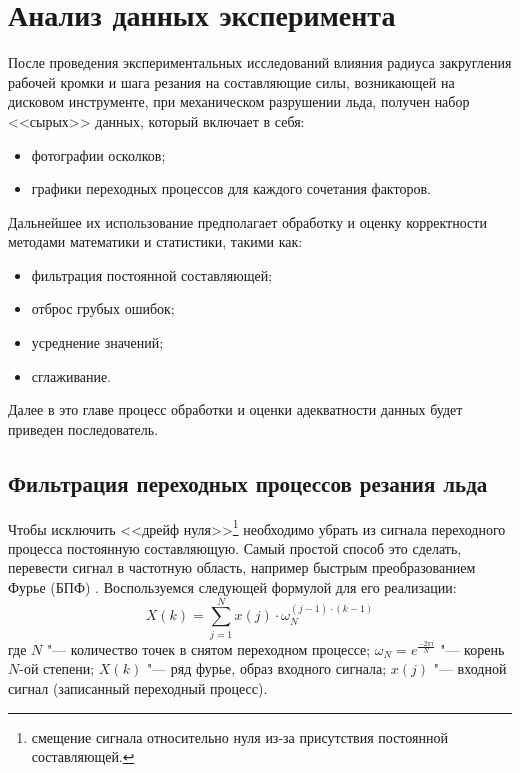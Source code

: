 \chapter{Анализ данных эксперимента}\label{chapt3}

После проведения экспериментальных исследований влияния радиуса закругления рабочей кромки и шага резания на составляющие силы, возникающей на дисковом инструменте, при механическом разрушении льда, получен набор <<сырых>> данных, который включает в себя:
\begin{itemize}
	\item фотографии осколков;
	\item графики переходных процессов для каждого сочетания факторов.
\end{itemize}

Дальнейшее их использование предполагает обработку и оценку корректности методами математики и статистики, такими как:
\begin{itemize}
	\item фильтрация постоянной составляющей;
	\item отброс грубых ошибок;
	\item усреднение значений;	
	\item сглаживание.
\end{itemize}

Далее в это главе процесс обработки и оценки адекватности данных будет приведен последователь.

\section{Фильтрация переходных процессов резания льда}\label{sect3_1}

Чтобы исключить <<дрейф нуля>>\footnote{смещение сигнала относительно нуля из-за присутствия постоянной составляющей.} необходимо убрать из сигнала переходного процесса постоянную составляющую. Самый простой способ это сделать, перевести сигнал в частотную область, например быстрым преобразованием Фурье (БПФ) \cite{BPF,BPFEng}. Воспользуемся следующей формулой для его реализации:
\begin{equation}\label{eq:FFT}
X(k)=\sum_{j=1}^{N} x(j)\cdot\omega_{N}^{(j-1)\cdot(k-1)}
\end{equation}
где $ N $ "--- количество точек в снятом переходном процессе; $ \omega_{N} = e^{\frac{-2\pi i}{N}} $ "--- корень $ N $-ой степени; $ X(k) $ "--- ряд фурье, образ входного сигнала; $ x(j) $ "--- входной сигнал (записанный переходный процесс).


